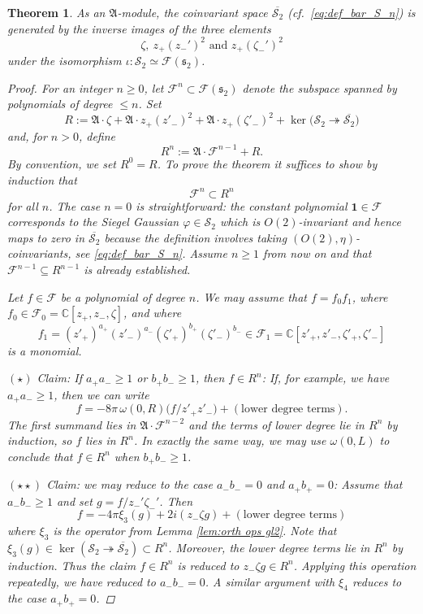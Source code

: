 \documentclass[reqno, 11pt]{amsart} %
\numberwithin{equation}{section}
\theoremstyle{plain}
\newtheorem{theorem}{Theorem}[section]
\theoremstyle{definition}
\theoremstyle{remark}
\newcommand{\ov}{\overline}
\newcommand{\mcF}{\mathcal{F}}
\newcommand{\mcS}{\mathcal{S}}
\newcommand{\mfA}{\mathfrak{A}}
\newcommand{\mfs}{\mathfrak{s}}
\newcommand{\bbC}{\mathbb C}
\newcommand{\calF}{\mathcal F}
\newcommand{\lie}[1]{ \mathfrak{#1}}
\newcommand{\mn}{\medskip \noindent}
\begin{document}
\begin{theorem}\label{thm:generators_S2}
As an $\lie A$-module, the coinvariant space $\ov{\mathcal S_2}$ (cf.\ \eqref{eq:def_bar_S_n}) is generated by the inverse images of the  three elements $$\zeta, \  z_+ (z_-')^2 \text{ and } z_+ (\zeta_-')^2 $$  under the isomorphism $\iota \colon \mathcal S_2 \simeq \calF(\lie s_2)$.

\begin{proof}

For an integer $n \geq 0$, let $\calF^{n} \subset \calF(\mfs_2)$ denote the subspace spanned by polynomials of degree $\leq n$. Set
\[
R := \lie A \cdot \zeta + \lie A \cdot z_+(z'_-)^2 + \lie A \cdot z_+(\zeta'_-)^2 + \ker\big(\mcS_2 \twoheadrightarrow \ov{\mcS_2}\big)
\]
and, for $n>0$, define
\[
R^n := \lie A \cdot \calF^{n-1} + R.
\]
By convention, we set $R^0 = R$.
To prove the theorem it suffices to show by induction that
\begin{equation} \label{eqn:gl2 proof induction statement}
\mathcal F^n \subset R^n
\end{equation}
for all $n$. The case $n = 0$ is straightforward: the constant polynomial $\mathbf 1 \in \calF$ corresponds to the Siegel Gaussian $φ\in \mcS_2$ which is $O(2)$-invariant and hence maps to zero in $\ov{\mcS_2}$ because the definition involves taking $(O(2), η)$-coinvariants, see \eqref{eq:def_bar_S_n}. Assume $n \geq 1$ from now on and that $\mcF^{n-1} \subseteq R^{n-1}$ is already established.

Let $f  \in \calF$ be a polynomial of degree $n$. We may assume that $f = f_0 f_1$, where $f_0 \in \calF_0 = \bbC[z_{+}, z_-, \zeta]$, and where
\[
f_1 = (z'_+)^{a_+}(z'_-)^{a_-}(\zeta'_+)^{b_+} (\zeta'_-)^{b_-}	 \in \mathcal F_1 = \bbC[ z'_+, z'_-, \zeta'_+, \zeta'_-]	\]
is a monomial.

\mn   \emph{$(\star)$ Claim: If $a_+a_- \geq 1$ or $b_+b_-\geq 1$, then $f\in R^n$:}  If, for example, we have $a_+ a_- \geq 1$, then we can write
\[
f = - 8 \pi  \, \omega(0,R)  \Big( {f}/{ z'_+ z'_- }\Big)  + (\text{lower degree terms}).
\]
The first summand lies in $\mfA\cdot \mcF^{n-2}$ and the terms of lower degree lie in $R^n$ by induction, so $f$ lies in $R^n$. In exactly the same way, we may use $\omega(0,L)$ to conclude that $f \in R^n$ when $b_+ b_- \geq 1$.

\mn  \emph{$(\star\star)$ Claim: we may reduce to the case $a_-b_- = 0$ and $a_+b_+ = 0$:} Assume that $a_- b_-\geq 1$ and set $g = f/z_-' \zeta_-'$. Then
\[
f = - 4 \pi \xi_3(g) + 2i (z_- \zeta g)+ (\text{lower degree terms})
\]
where $\xi_3$ is the operator from Lemma \ref{lem:orth ops gl2}. Note that $\xi_3(g) \in \ker(\mcS_2 \twoheadrightarrow \ov{\mcS_2}) \subset R^n$. Moreover, the lower degree terms lie in $R^n$ by induction. Thus the claim $f\in R^n$ is reduced to $z_-ζg\in R^n$. 	Applying this operation repeatedly, we have reduced to $a_- b_- = 0$. A similar argument with $\xi_4$ reduces to the case $a_+ b_+ = 0$.


\end{proof}
\end{theorem}
\end{document}
